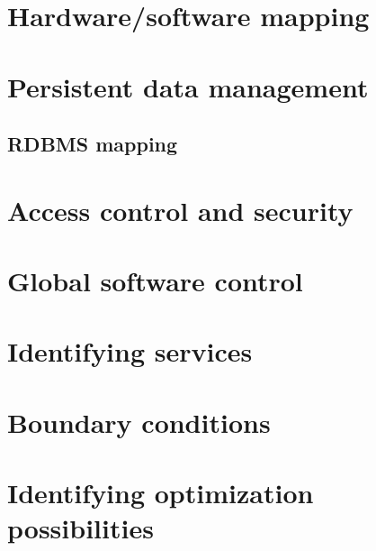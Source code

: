 


\section{Hardware/software mapping}

\section{Persistent data management}

\subsection{RDBMS mapping}

\section{Access control and security}

\section{Global software control}

\section{Identifying services}

\section{Boundary conditions}

\section{Identifying optimization possibilities}